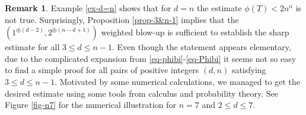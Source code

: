 \documentclass[12pt]{amsart}
\theoremstyle{definition}
\newtheorem{rmk}[thm]{Remark}
\begin{document}
\begin{rmk}
Example \ref{ex-d=n} shows that for $d=n$ the estimate $\phi(T)<2n^n$ is not true. Surprisingly, Proposition \ref{prop-3&n-1} implies that the $(1^{\oplus (d-2)}, 2^{\oplus (n-d+1)})$ weighted blow-up is sufficient to establish the sharp estimate for all $3\le d\le n-1$.
Even though the statement appears elementary, due to the complicated expansion from \eqref{eq-phibi}-\eqref{eq-Phibi} it seems not so easy to find a simple proof for all pairs of positive integers $(d,n)$ satisfying $3\le d\le n-1$. Motivated by some numerical calculations, we managed to get the desired estimate using some tools from calculus and probability theory. See Figure \ref{fig-n7} for the numerical illustration for $n=7$ and $2\le d\le 7$. 
\end{rmk}
\end{document}
